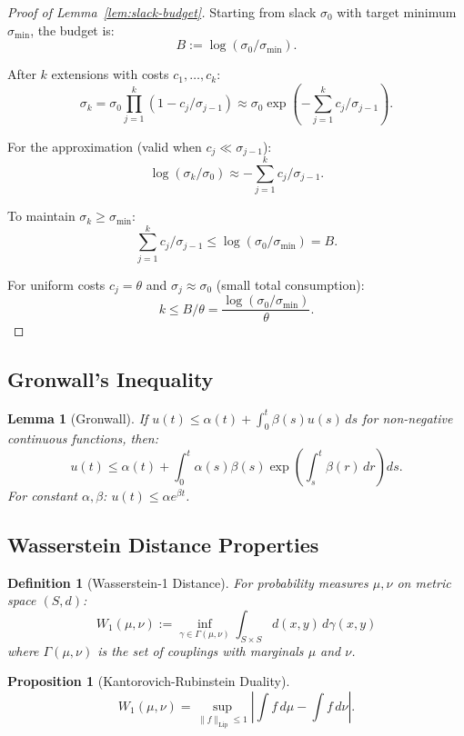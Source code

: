 \documentclass[12pt]{article}
\newtheorem{lemma}[theorem]{Lemma}
\newtheorem{proposition}[theorem]{Proposition}
\newtheorem{definition}[theorem]{Definition}
\begin{document}
\begin{proof}[Proof of Lemma~\ref{lem:slack-budget}]
Starting from slack $\sigma_0$ with target minimum $\sigma_{\min}$, the budget is:
\[
B := \log(\sigma_0 / \sigma_{\min}).
\]

After $k$ extensions with costs $c_1, \ldots, c_k$:
\[
\sigma_k = \sigma_0 \prod_{j=1}^k (1 - c_j / \sigma_{j-1}) \approx \sigma_0 \exp\left( -\sum_{j=1}^k c_j / \sigma_{j-1} \right).
\]

For the approximation (valid when $c_j \ll \sigma_{j-1}$):
\[
\log(\sigma_k / \sigma_0) \approx -\sum_{j=1}^k c_j / \sigma_{j-1}.
\]

To maintain $\sigma_k \geq \sigma_{\min}$:
\[
\sum_{j=1}^k c_j / \sigma_{j-1} \leq \log(\sigma_0 / \sigma_{\min}) = B.
\]

For uniform costs $c_j = \theta$ and $\sigma_j \approx \sigma_0$ (small total consumption):
\[
k \leq B / \theta = \frac{\log(\sigma_0 / \sigma_{\min})}{\theta}.
\]
\end{proof}

\subsection{Gronwall's Inequality}

\begin{lemma}[Gronwall]
\label{lem:gronwall}
If $u(t) \leq \alpha(t) + \int_0^t \beta(s) u(s) \, ds$ for non-negative continuous functions, then:
\[
u(t) \leq \alpha(t) + \int_0^t \alpha(s) \beta(s) \exp\left( \int_s^t \beta(r) \, dr \right) ds.
\]
For constant $\alpha, \beta$: $u(t) \leq \alpha e^{\beta t}$.
\end{lemma}

\subsection{Wasserstein Distance Properties}

\begin{definition}[Wasserstein-1 Distance]
For probability measures $\mu, \nu$ on metric space $(S, d)$:
\[
W_1(\mu, \nu) := \inf_{\gamma \in \Gamma(\mu, \nu)} \int_{S \times S} d(x, y) \, d\gamma(x, y)
\]
where $\Gamma(\mu, \nu)$ is the set of couplings with marginals $\mu$ and $\nu$.
\end{definition}

\begin{proposition}[Kantorovich-Rubinstein Duality]
\[
W_1(\mu, \nu) = \sup_{\|f\|_{\text{Lip}} \leq 1} \left| \int f \, d\mu - \int f \, d\nu \right|.
\]
\end{proposition}
\end{document}
